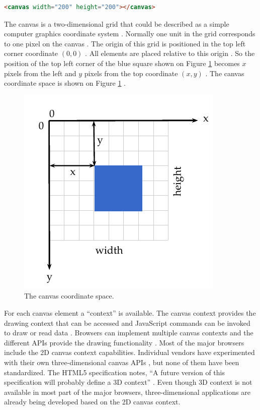 \begin{lstlisting}[language=HTML,label={lst:canvas_element_markup},caption=The HTML canvas element markup]
<canvas width="200" height="200"></canvas>
\end{lstlisting}

The canvas \cite{Canvas2013} is a two-dimensional grid that could be described as a simple computer graphics coordinate system \cite{Hartley2004}. Normally one unit in the grid corresponds to one pixel on the canvas \cite{Canvas2013}. The origin of this grid is positioned in the top left corner coordinate $(0,0)$ \cite{Canvas2013}. All elements are placed relative to this origin \cite{Canvas2013}. So the position of the top left corner of the blue square shown on Figure \ref{figure:canvas_axis} becomes $x$ pixels from the left and $y$ pixels from the top coordinate $(x,y)$ \cite{Canvas2013}. The canvas coordinate space is shown on Figure \ref{figure:canvas_axis} \cite{MDN2013}.

 \begin{figure}[!htb]
   \centering
   \includegraphics{chapters/basic_concepts/canvas_axis.pdf}
   \caption{The canvas coordinate space.}
   \label{figure:canvas_axis}
 \end{figure}

For each canvas element \cite{Canvas2013} a ``context'' is available. The canvas context provides the drawing context that can be accessed and JavaScript \cite{International2009} commands can be invoked to draw or read data \cite{Canvas2013}. Browsers can implement multiple canvas contexts and the different APIs provide the drawing functionality \cite{Canvas2013}. Most of the major browsers include the 2D canvas context capabilities. Individual vendors have experimented with their own three-dimensional canvas APIs \cite{Canvas2013}, but none of them have been standardized. The HTML5 \cite{Hickson2013} specification notes, ``A future version of this specification will probably define a 3D context'' \cite{Canvas2013}. Even though 3D context is not available in most part of the major browsers, three-dimensional applications are already being developed based on the 2D canvas context.

